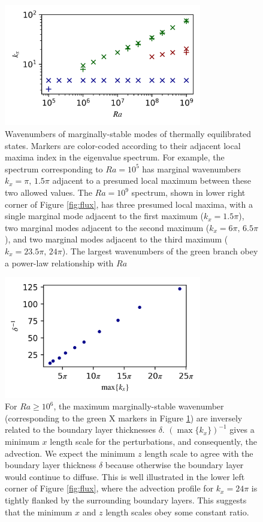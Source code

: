 \documentclass[reprint,amsmath,amssymb,aps]{revtex4-1}
\begin{document}
\begin{figure}[h]
    \centering
    \includegraphics[width=3.4in]{kx_m_ra1.png}
    \caption{Wavenumbers of marginally-stable modes of thermally equilibrated states. Markers are color-coded according to their adjacent local maxima index in the eigenvalue spectrum. For example, the spectrum corresponding to $Ra = 10^5$ has marginal wavenumbers $k_x = \pi, \, 1.5\pi$ adjacent to a presumed local maximum between these two allowed values. The $Ra = 10^9$ spectrum, shown in lower right corner of Figure \ref{fig:flux}, has three presumed local maxima, with a single marginal mode adjacent to the first maximum ($k_x = 1.5\pi$), two marginal modes adjacent to the second maximum ($k_x = 6\pi, \, 6.5\pi$), and two marginal modes adjacent to the third maximum ($k_x = 23.5\pi, \, 24\pi$). The largest wavenumbers of the green branch obey a power-law relationship with $Ra$}
    \label{fig:kx_marginals}
\end{figure}
\begin{figure}[h]
    \centering
    \includegraphics[width=3.4in]{del_kx_inv.png}
    \caption{For $Ra \geq 10^6$, the maximum marginally-stable wavenumber (corresponding to the green X markers in Figure \ref{fig:kx_marginals}) are inversely related to the boundary layer thicknesses $\delta$. $(\max \{ k_x \})^{-1}$ gives a minimum $x$ length scale for the perturbations, and consequently, the advection. We expect the minimum $z$ length scale to agree with the boundary layer thickness $\delta$ because otherwise the boundary layer would continue to diffuse. This is well illustrated in the lower left corner of Figure \ref{fig:flux}, where the advection profile for $k_x = 24\pi$ is tightly flanked by the surrounding boundary layers. This suggests that the minimum $x$ and $z$ length scales obey some constant ratio.}
    \label{fig:del_inv}
\end{figure}
\end{document}
